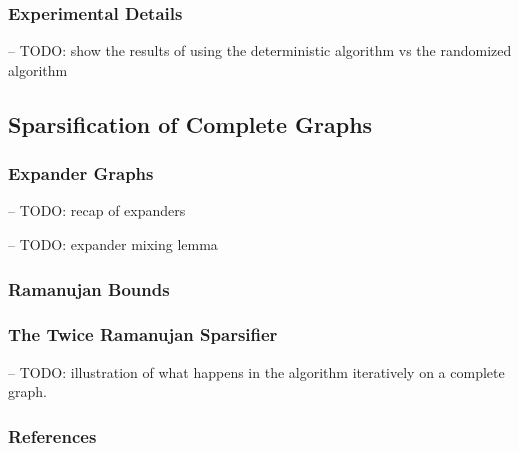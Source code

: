 \documentclass[
  letterpaper,
  DIV=11,
  numbers=noendperiod]{scrartcl}
\theoremstyle{plain}
\theoremstyle{plain}
\theoremstyle{plain}
\theoremstyle{definition}
\theoremstyle{remark}
\begin{document}
\hypertarget{experimental-details}{%
\subsubsection{Experimental Details}\label{experimental-details}}

-- TODO: show the results of using the deterministic algorithm vs the
randomized algorithm

\hypertarget{sparsification-of-complete-graphs}{%
\subsection{Sparsification of Complete
Graphs}\label{sparsification-of-complete-graphs}}

\hypertarget{expander-graphs}{%
\subsubsection{Expander Graphs}\label{expander-graphs}}

-- TODO: recap of expanders

-- TODO: expander mixing lemma

\hypertarget{ramanujan-bounds}{%
\subsubsection{Ramanujan Bounds}\label{ramanujan-bounds}}

\hypertarget{the-twice-ramanujan-sparsifier}{%
\subsubsection{The Twice Ramanujan
Sparsifier}\label{the-twice-ramanujan-sparsifier}}

-- TODO: illustration of what happens in the algorithm iteratively on a
complete graph.

\hypertarget{references}{%
\subsubsection{References}\label{references}}
\end{document}

